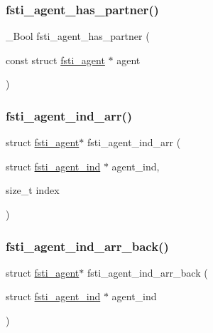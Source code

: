 \subsubsection{\texorpdfstring{fsti\+\_\+agent\+\_\+has\+\_\+partner()}{fsti\_agent\_has\_partner()}}
{\footnotesize\ttfamily \+\_\+\+Bool fsti\+\_\+agent\+\_\+has\+\_\+partner (\begin{DoxyParamCaption}\item[{const struct \mbox{\hyperlink{structfsti__agent}{fsti\+\_\+agent}} $\ast$}]{agent }\end{DoxyParamCaption})}

\mbox{\label{fsti-agent_8h_a0e45e82b7f4f019b1813daf04717b894}} 
\subsubsection{\texorpdfstring{fsti\+\_\+agent\+\_\+ind\+\_\+arr()}{fsti\_agent\_ind\_arr()}}
{\footnotesize\ttfamily struct \mbox{\hyperlink{structfsti__agent}{fsti\+\_\+agent}}$\ast$ fsti\+\_\+agent\+\_\+ind\+\_\+arr (\begin{DoxyParamCaption}\item[{struct \mbox{\hyperlink{structfsti__agent__ind}{fsti\+\_\+agent\+\_\+ind}} $\ast$}]{agent\+\_\+ind,  }\item[{size\+\_\+t}]{index }\end{DoxyParamCaption})}

\mbox{\label{fsti-agent_8h_aac56f2d510cd312bdb5b32a221e00309}} 
\subsubsection{\texorpdfstring{fsti\+\_\+agent\+\_\+ind\+\_\+arr\+\_\+back()}{fsti\_agent\_ind\_arr\_back()}}
{\footnotesize\ttfamily struct \mbox{\hyperlink{structfsti__agent}{fsti\+\_\+agent}}$\ast$ fsti\+\_\+agent\+\_\+ind\+\_\+arr\+\_\+back (\begin{DoxyParamCaption}\item[{struct \mbox{\hyperlink{structfsti__agent__ind}{fsti\+\_\+agent\+\_\+ind}} $\ast$}]{agent\+\_\+ind }\end{DoxyParamCaption})}

